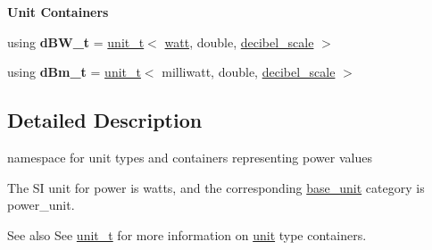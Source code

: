 \begin{Indent}{\bf Unit Containers}
\begin{DoxyCompactItemize}
\item 
\hypertarget{namespaceunits_1_1power_a549dede42b7ac252ad1626386b57029c}{}using {\bfseries d\+B\+W\+\_\+t} = \hyperlink{classunits_1_1unit__t}{unit\+\_\+t}$<$ \hyperlink{structunits_1_1unit}{watt}, double, \hyperlink{structunits_1_1decibel__scale}{decibel\+\_\+scale} $>$\label{namespaceunits_1_1power_a549dede42b7ac252ad1626386b57029c}

\item 
\hypertarget{namespaceunits_1_1power_a1ee9633181e3088d5af861ae49ad2913}{}using {\bfseries d\+Bm\+\_\+t} = \hyperlink{classunits_1_1unit__t}{unit\+\_\+t}$<$ milliwatt, double, \hyperlink{structunits_1_1decibel__scale}{decibel\+\_\+scale} $>$\label{namespaceunits_1_1power_a1ee9633181e3088d5af861ae49ad2913}

\end{DoxyCompactItemize}
\end{Indent}


\subsection{Detailed Description}
namespace for unit types and containers representing power values 

The S\+I unit for power is {\ttfamily watts}, and the corresponding {\ttfamily \hyperlink{structunits_1_1base__unit}{base\+\_\+unit}} category is {\ttfamily power\+\_\+unit}. \begin{DoxySeeAlso}{See also}
See \hyperlink{classunits_1_1unit__t}{unit\+\_\+t} for more information on \hyperlink{structunits_1_1unit}{unit} type containers. 
\end{DoxySeeAlso}
